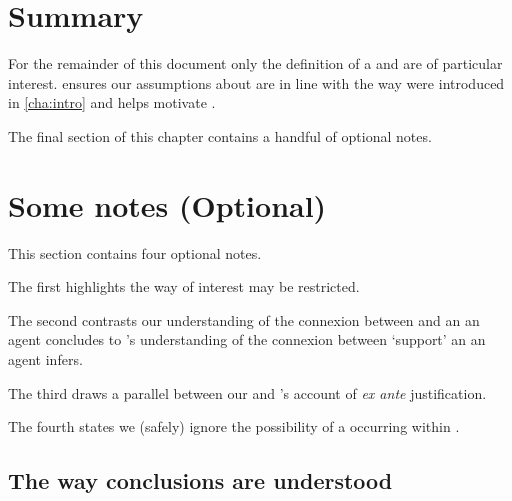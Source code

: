 \section*{Summary}


\begin{note}
  For the remainder of this document only the definition of a \wit{} and \supportII{} are of particular interest.
  \supportI{} ensures our assumptions about \fingfr{} are in line with the way  were introduced in \autoref{cha:intro} and helps motivate \supportII{}.
\end{note}


\begin{note}
  The final section of this chapter contains a handful of optional notes.
\end{note}



\newpage



\section[Some notes]{Some notes \hfill (Optional)}


\begin{note}
  This section contains four optional notes.

  The first highlights the way  of interest may be restricted.

  The second contrasts our understanding of the connexion between  and an  an agent concludes to \citeauthor{Boghossian:2014aa}'s understanding of the connexion between `support' an  an agent infers.

  The third draws a parallel between our \supportII{} and \citeauthor{Goldman:1979ui}'s account of \emph{ex ante} justification.

  The fourth states we (safely) ignore the possibility of a \fingfr{} occurring within \fingfr{}.
\end{note}


\subsection*{The way conclusions are understood}



